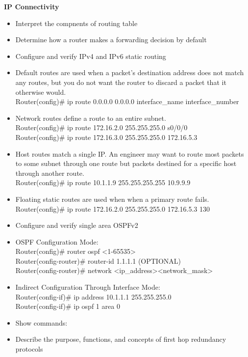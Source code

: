 \documentclass{article}
\begin{document}
\begin{flushleft}\textbf{IP Connectivity}\end{flushleft}
\begin{itemize}
  \item Interpret the compnents of routing table
  \item Determine how a router makes a forwarding decision by default
  \item Configure and verify IPv4 and IPv6 static routing
  	\item[] Default routes are used when a packet's destination address does not match any routes, but you do not want the router to discard a packet that it otherwise would.\\
  		Router(config)\# ip route 0.0.0.0 0.0.0.0 interface\_name interface\_number\\
  	\item[] Network routes define a route to an entire subnet.\\
  		Router(config)\# ip route 172.16.2.0 255.255.255.0 s0/0/0\\
  		Router(config)\# ip route 172.16.3.0 255.255.255.0 172.16.5.3
  	\item[] Host routes match a single IP. An engineer may want to route most packets to some subnet through one route but packets destined for a specific host through another route.\\
  		Router(config)\# ip route 10.1.1.9 255.255.255.255 10.9.9.9
  	\item[] Floating static routes are used when when a primary route fails.\\
  		Router(config)\# ip route 172.16.2.0 255.255.255.0 172.16.5.3 130
  \item Configure and verify single area OSPFv2
  	\item[] OSPF Configuration Mode:\\
  		Router(config)\# router ospf \textless 1-65535\textgreater\\
  		Router(config-router)\# router-id 1.1.1.1 (OPTIONAL)\\
  		Router(config-router)\# network \textless ip\_address\textgreater \textless network\_mask\textgreater
  	\item[] Indirect Configuration Through Interface Mode:\\
  		Router(config-if)\# ip address 10.1.1.1 255.255.255.0\\
  		Router(config-if)\# ip ospf 1 area 0
  	\item[] Show commands:
  \item Describe the purpose, functions, and concepts of first hop redundancy protocols\\
\end{itemize}
\end{document}
